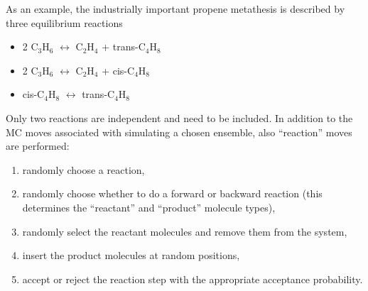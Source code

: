 As an example, the industrially important propene metathesis is described by three equilibrium reactions
\begin{itemize}
\item{2 C$_3$H$_6$ $\leftrightarrow$ C$_2$H$_4$ + trans-C$_4$H$_8$}
\item{2 C$_3$H$_6$ $\leftrightarrow$ C$_2$H$_4$ + cis-C$_4$H$_8$}
\item{cis-C$_4$H$_8$ $\leftrightarrow$ trans-C$_4$H$_8$}
\end{itemize}
Only two reactions are independent and need to be included. In addition to the MC moves associated with
simulating a chosen ensemble, also ``reaction'' moves are performed:
\begin{enumerate}
\item{randomly choose a reaction,}
\item{randomly choose whether to do a forward or backward reaction (this determines the ``reactant'' and ``product'' molecule types),}
\item{randomly select the reactant molecules and remove them from the system},
\item{insert the product molecules at random positions},
\item{accept or reject the reaction step with the appropriate acceptance probability.}
\end{enumerate}

